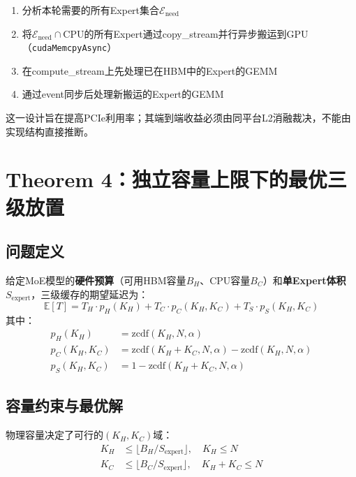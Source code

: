 \documentclass[11pt,a4paper]{article}
\begin{document}
\begin{enumerate}
    \item 分析本轮需要的所有Expert集合$\mathcal{E}_{\text{need}}$
    \item 将$\mathcal{E}_{\text{need}} \cap \text{CPU}$的所有Expert通过copy\_stream并行异步搬运到GPU（\texttt{cudaMemcpyAsync}）
    \item 在compute\_stream上先处理已在HBM中的Expert的GEMM
    \item 通过event同步后处理新搬运的Expert的GEMM
\end{enumerate}

这一设计旨在提高PCIe利用率；其端到端收益必须由同平台L2消融裁决，不能由实现结构直接推断。

\section{Theorem 4：独立容量上限下的最优三级放置}

\subsection{问题定义}

给定MoE模型的\textbf{硬件预算}（可用HBM容量$B_H$、CPU容量$B_C$）和\textbf{单Expert体积$S_{\text{expert}}$}，三级缓存的期望延迟为：
\begin{equation}
    \mathbb{E}[T] = T_H \cdot p_H(K_H) + T_C \cdot p_C(K_H, K_C) + T_S \cdot p_S(K_H, K_C)
\end{equation}
其中：
\begin{align}
    p_H(K_H) &= \text{zcdf}(K_H, N, \alpha) \\
    p_C(K_H, K_C) &= \text{zcdf}(K_H + K_C, N, \alpha) - \text{zcdf}(K_H, N, \alpha) \\
    p_S(K_H, K_C) &= 1 - \text{zcdf}(K_H + K_C, N, \alpha)
\end{align}

\subsection{容量约束与最优解}

物理容量决定了可行的$(K_H, K_C)$域：
\begin{align}
    K_H &\leq \lfloor B_H / S_{\text{expert}} \rfloor, \quad K_H \leq N \\
    K_C &\leq \lfloor B_C / S_{\text{expert}} \rfloor, \quad K_H + K_C \leq N
\end{align}
\end{document}
